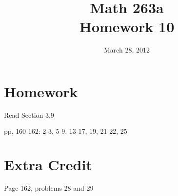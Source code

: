 \documentclass[fleqn]{exam}
\title{Math 263a \\ Homework 10}
\date{March 28, 2012}
\begin{document}
\maketitle

\section{Homework}

\begin{itemize*}
  \item Read Section 3.9
  \item pp. 160-162: 2-3, 5-9, 13-17, 19, 21-22, 25
\end{itemize*}

\section{Extra Credit}
Page 162, problems 28 and 29
\end{document}
